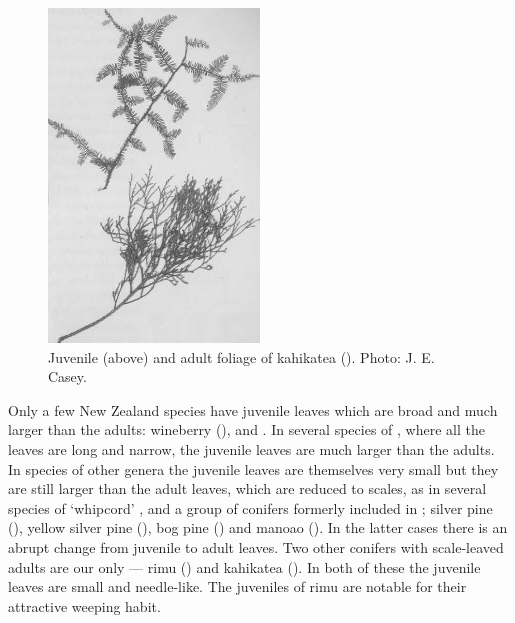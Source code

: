 \begin{figure}
	\includegraphics[width=0.5\textwidth]{graphics/figure22kahikatea.jpg}
	\centering
	\caption[Kahikatea foliage]{Juvenile (above) and adult foliage of kahikatea ().
	Photo: J. E. Casey.}%
	\label{fig:22kahikatea}
\end{figure}

Only a few New Zealand species have juvenile leaves which are broad and much larger than the adults: wineberry (),  and .
In several species of , where all the leaves are long and narrow, the juvenile leaves are much larger than the adults.
In species of other genera the juvenile leaves are themselves very small but they are still larger than the adult leaves, which are reduced to scales, as in several species of `whipcord' ,  and a group of conifers formerly included in ; silver pine (), yellow silver pine (), bog pine ()  and manoao ().
In the latter cases there is an abrupt change from juvenile to adult leaves.
Two other conifers with scale-leaved adults are our only  --- rimu () and kahikatea ().
In both of these the juvenile leaves are small and needle-like.
The juveniles of rimu are notable for their attractive weeping habit.

